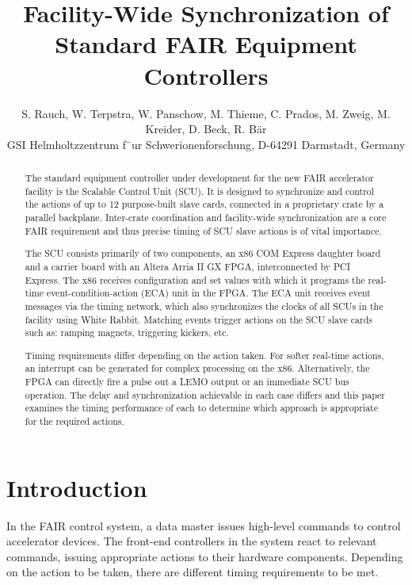 \documentclass{JAC2003}
\begin{document}
\title{Facility-Wide Synchronization of Standard FAIR Equipment Controllers}

\author{
S. Rauch,
W. Terpstra,
W. Panschow,
M. Thieme,
C. Prados,
M. Zweig,
M. Kreider,
D. Beck,
R. B\"ar\\
GSI Helmholtzzentrum f¨ur Schwerionenforschung, D-64291 Darmstadt, Germany}

\maketitle

\begin{abstract}
The standard equipment controller under development for the new FAIR
accelerator facility is the Scalable Control Unit (SCU). It is designed to
synchronize and control the actions of up to 12 purpose-built slave cards,
connected in a proprietary crate by a parallel backplane. Inter-crate
coordination and facility-wide synchronization are a core FAIR requirement
and thus precise timing of SCU slave actions is of vital importance.

The SCU consists primarily of two components, an x86 COM Express daughter
board and a carrier board with an Altera Arria II GX FPGA, interconnected by
PCI Express. The x86 receives configuration and set values with which it
programs the real-time event-condition-action (ECA) unit in the FPGA. The
ECA unit receives event messages via the timing network, which also
synchronizes the clocks of all SCUs in the facility using White Rabbit.
Matching events trigger actions on the SCU slave cards such as: ramping
magnets, triggering kickers, etc.

Timing requirements differ depending on the action taken. For softer
real-time actions, an interrupt can be generated for complex processing on
the x86. Alternatively, the FPGA can directly fire a pulse out a LEMO output
or an immediate SCU bus operation. The delay and synchronization achievable
in each case differs and this paper examines the timing performance of each
to determine which approach is appropriate for the required actions.
\end{abstract}

\section{Introduction}
In the FAIR control system,
a data master issues high-level commands to control accelerator devices.
The front-end controllers in the system react to relevant commands,
issuing appropriate actions to their hardware components.
Depending on the action to be taken,
there are different timing requirements to be met.
\end{document}
